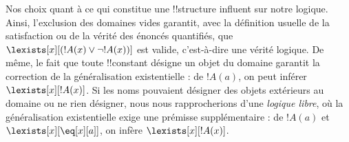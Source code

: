 \documentclass[../../../include/open-logic-section]{subfiles}
\begin{document}
\begin{digress}
Nos choix quant à ce qui constitue une !!{structure} influent sur
notre logique. Ainsi, l'exclusion des domaines vides garantit, avec
la définition usuelle de la satisfaction ou de la vérité des énoncés
quantifiés, que $\lexists[x][(!A(x) \lor \lnot !A(x))]$ est valide,
c'est-à-dire une vérité logique. De même, le fait que toute
!!{constant} désigne un objet du domaine garantit la correction
de la généralisation existentielle : de $!A(a)$, on peut inférer
$\lexists[x][!A(x)]$. Si les noms pouvaient désigner des objets
extérieurs au domaine ou ne rien désigner, nous nous rapprocherions
d'une \emph{logique libre}, où la généralisation existentielle exige
une prémisse supplémentaire : de $!A(a)$ et
$\lexists[x][\eq[x][a]]$, on infère $\lexists[x][!A(x)]$.
\end{digress}
\end{document}
